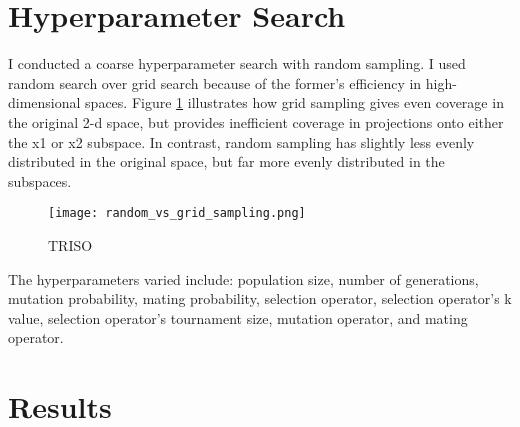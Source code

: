 \section{Hyperparameter Search}
I conducted a coarse hyperparameter search with random sampling. 
I used random search over grid search because of the former's efficiency in 
high-dimensional spaces. 
Figure \ref{fig:random_vs_grid_sampling} illustrates how grid sampling gives 
even coverage in the original 2-d space, but provides inefficient coverage in 
projections onto either the x1 or x2 subspace.  
In contrast, random sampling has slightly less evenly distributed in the original 
space, but far more evenly distributed in the subspaces.
\begin{figure}[]
    \centering
    \texttt{[image: random\_vs\_grid\_sampling.png]} 
    \caption{TRISO}
    \label{fig:random_vs_grid_sampling}
\end{figure}
The hyperparameters varied include: population size, number of generations, 
mutation probability, mating probability, selection operator, selection operator's 
k value, selection operator's tournament size, mutation operator, and mating 
operator.  

\section{Results}
